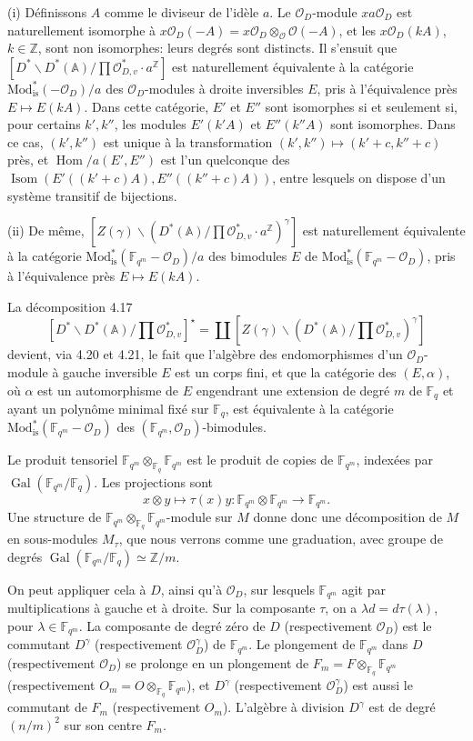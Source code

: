 \documentclass[10pt]{article}
\newcommand{\Fq}{\mathbb F_q}
\newcommand{\Fqm}{\mathbb F_{q^m}}
\newcommand{\Z}{\mathbb Z}
\newcommand{\Adele}{\mathbb A}
\newcommand{\Isom}{\operatorname{Isom}}
\newcommand{\Gal}{\operatorname{Gal}}
\newcommand{\Hom}{\operatorname{Hom}}
\newcommand{\OD}{\mathcal O_D}
\newcommand{\OO}{\mathcal O}
\theoremstyle{deligne}
\newcommand{\heading}[1]{\vspace{0.7em}\noindent{\bfseries #1}\quad}
\begin{document}
\heading{Variantes 4.22.} (i) Définissons $A$ comme le diviseur de l'id\`ele $a$. Le $\OD$-module $xa\OD$ est naturellement isomorphe à $x\OD(-A)=x\OD\otimes_\OO\OO(-A)$, et les $x\OD(kA)$, $k\in\Z$, sont non isomorphes: leurs degrés sont distincts. Il s'ensuit que $[D^*\backslash D^*(\Adele)/\prod\mathcal O_{D,v}^*\cdot a^\Z]$ est naturellement équivalente à la catégorie $\mathrm{Mod}_{\mathrm{is}}^*(-\OD)/a$ des $\OD$-modules à droite inversibles $E$, pris à l'équivalence près $E\mapsto E(kA)$. Dans cette catégorie, $E'$ et $E''$ sont isomorphes si et seulement si, pour certains $k',k''$, les modules $E'(k'A)$ et $E''(k''A)$ sont isomorphes. Dans ce cas, $(k',k'')$ est unique à la transformation $(k',k'')\mapsto(k'+c,k''+c)$ près, et $\Hom/a(E',E'')$ est l'un quelconque des $\Isom(E'((k'+c)A),E''((k''+c)A))$, entre lesquels on dispose d'un système transitif de bijections.

(ii) De même, $[Z(\gamma)\backslash(D^*(\Adele)/\prod\mathcal O_{D,v}^*\cdot a^\Z)^\gamma]$ est naturellement équivalente à la catégorie $\mathrm{Mod}_{\mathrm{is}}^*(\Fqm-\OD)/a$ des bimodules $E$ de $\mathrm{Mod}_{\mathrm{is}}^*(\Fqm-\OD)$, pris à l'équivalence près $E\mapsto E(kA)$.

\heading{Remarque 4.23.} La décomposition 4.17
\[
[D^*\backslash D^*(\Adele)/\prod\mathcal O_{D,v}^*]^\star
=\coprod [Z(\gamma)\backslash(D^*(\Adele)/\prod\mathcal O_{D,v}^*)^\gamma]
\]
devient, via 4.20 et 4.21, le fait que l'algèbre des endomorphismes d'un $\OD$-module à gauche inversible $E$ est un corps fini, et que la catégorie des $(E,\alpha)$, où $\alpha$ est un automorphisme de $E$ engendrant une extension de degré $m$ de $\Fq$ et ayant un polynôme minimal fixé sur $\Fq$, est équivalente à la catégorie $\mathrm{Mod}_{\mathrm{is}}^*(\Fqm-\OD)$ des $(\Fqm,\OD)$-bimodules.

\heading{4.24.} Le produit tensoriel $\Fqm\otimes_{\Fq}\Fqm$ est le produit de copies de $\Fqm$, indexées par $\Gal(\Fqm/\Fq)$. Les projections sont
\[
x\otimes y\longmapsto \tau(x)y:\Fqm\otimes\Fqm\longrightarrow\Fqm.
\]
Une structure de $\Fqm\otimes_{\Fq}\Fqm$-module sur $M$ donne donc une décomposition de $M$ en sous-modules $M_\tau$, que nous verrons comme une graduation, avec groupe de degrés $\Gal(\Fqm/\Fq)\simeq\Z/m$.

On peut appliquer cela à $D$, ainsi qu'à $\OD$, sur lesquels $\Fqm$ agit par multiplications à gauche et à droite. Sur la composante $\tau$, on a $\lambda d=d\tau(\lambda)$, pour $\lambda\in\Fqm$. La composante de degré zéro de $D$ (respectivement $\OD$) est le commutant $D^\gamma$ (respectivement $\OD^\gamma$) de $\Fqm$. Le plongement de $\Fqm$ dans $D$ (respectivement $\OD$) se prolonge en un plongement de $F_m=F\otimes_{\Fq}\Fqm$ (respectivement $O_m=O\otimes_{\Fq}\Fqm$), et $D^\gamma$ (respectivement $\OD^\gamma$) est aussi le commutant de $F_m$ (respectivement $O_m$). L'algèbre à division $D^\gamma$ est de degré $(n/m)^2$ sur son centre $F_m$.
\end{document}
